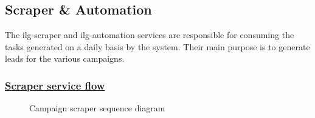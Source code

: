 \subsection{Scraper \& Automation}
The ilg-scraper and ilg-automation services are responsible for consuming the tasks generated on a daily basis by the system.
Their main purpose is to generate leads for the various campaigns.

\subsubsection*{\underline{Scraper service flow}}
\begin{figure}[H]
	\centering
	\caption{Campaign scraper sequence diagram}
	\label{fig:campaign-scraper-sequence-diagram}
\end{figure}
